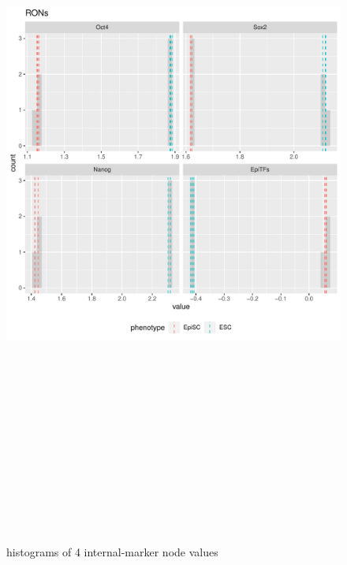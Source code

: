 \documentclass[
]{book}
\begin{document}
\begin{figure}[H]

{\centering \includegraphics[width=460pt,height=700pt]{ipsc/results/original-experimental_internalmarkers} 

}

\caption{histograms of 4 internal-marker node values}\label{fig:unnamed-chunk-27}
\end{figure}
\end{document}
